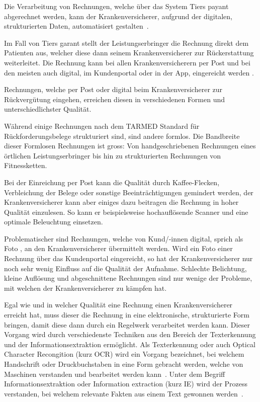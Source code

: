 Die Verarbeitung von Rechnungen, welche über das System Tiers payant abgerechnet werden, kann der Krankenversicherer, aufgrund der digitalen, strukturierten Daten, automatisiert gestalten~\autocite{BAG2016}.

Im Fall von Tiers garant stellt der Leistungserbringer die Rechnung direkt dem Patienten aus, welcher diese dann seinem Krankenversicherer zur Rückerstattung weiterleitet. Die Rechnung kann bei allen Krankenversicherern per Post und bei den meisten auch digital, im Kundenportal oder in der App, eingereicht werden \autocite{EDI2017}.

Rechnungen, welche per Post oder digital beim Krankenversicherer zur Rückvergütung eingehen, erreichen diesen in verschiedenen Formen und unterschiedlichster Qualität. 

Während einige Rechnungen nach dem TARMED Standard für Rückforderungsbelege strukturiert sind, sind andere formlos. Die Bandbreite dieser Formlosen Rechnungen ist gross: Von handgeschriebenen Rechnungen eines örtlichen Leistungserbringer bis hin zu strukturierten Rechnungen von Fitnessketten.

Bei der Einreichung per Post kann die Qualität durch Kaffee-Flecken, Verbleichung der Belege oder sonstige Beeinträchtigungen gemindert werden, der Krankenversicherer kann aber einiges dazu beitragen die Rechnung in hoher Qualität einzulesen. So kann er beispielsweise hochauflösende Scanner und eine optimale Beleuchtung einsetzen.

Problematischer sind Rechnungen, welche von Kund/-innen digital, sprich als Foto , an den Krankenversicherer übermittelt werden. Wird ein Foto einer Rechnung über das Kundenportal eingereicht, so hat der Krankenversicherer nur noch sehr wenig Einfluss auf die Qualität der Aufnahme. Schlechte Belichtung, kleine Auflösung und abgeschnittene Rechnungen sind nur wenige der Probleme, mit welchen der Krankenversicherer zu kämpfen hat.

Egal wie und in welcher Qualität eine Rechnung einen Krankenversicherer erreicht hat, muss dieser die Rechnung in eine elektronische, strukturierte Form bringen, damit diese dann durch ein Regelwerk verarbeitet werden kann. Dieser Vorgang wird durch verschiedenste Techniken aus den Bereich der Texterkennung und der Informationsextraktion ermöglicht. Als Texterkennung oder auch Optical Character Recongition (kurz OCR) wird ein Vorgang bezeichnet, bei welchem Handschrift oder Druckbuchstaben in eine Form gebracht werden, welche von Maschinen verstanden und bearbeitet werden kann~\autocite{Xue2014}. Unter dem Begriff Informationsextraktion oder Information extraction (kurz IE) wird der Prozess verstanden, bei welchem relevante Fakten aus einem Text gewonnen werden~\autocite{Piskorski2012}.

